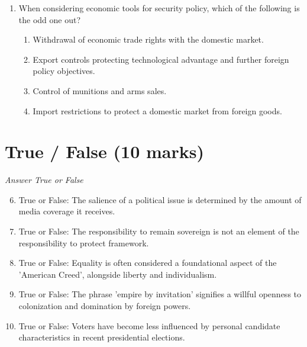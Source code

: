 \documentclass[12pt]{article}
\begin{document}
\begin{enumerate}[label=\arabic*.]
\begin{enumerate}[label=(\alph*)]
    \item It was designed as the antithesis of European politics
    \item It created a large standing army
    \item It encouraged the centralization of political power in the US
\end{enumerate}
\item When considering economic tools for security policy, which of the following is the odd one out?
\begin{enumerate}[label=(\alph*)]
    \item Withdrawal of economic trade rights with the domestic market.
    \item Export controls protecting technological advantage and further foreign policy objectives.
    \item Control of munitions and arms sales.
    \item Import restrictions to protect a domestic market from foreign goods.
\end{enumerate}
\end{enumerate}

\section*{True / False (10 marks)}
\textit{Answer True or False}
\begin{enumerate}[label=\arabic*.]
\setcounter{enumi}{5}
\item True or False: The salience of a political issue is determined by the amount of media coverage it receives.
\item True or False: The responsibility to remain sovereign is not an element of the responsibility to protect framework.
\item True or False: Equality is often considered a foundational aspect of the 'American Creed', alongside liberty and individualism.
\item True or False: The phrase 'empire by invitation' signifies a willful openness to colonization and domination by foreign powers.
\item True or False: Voters have become less influenced by personal candidate characteristics in recent presidential elections.
\end{enumerate}
\end{document}
